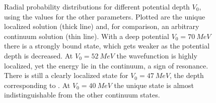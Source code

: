 \documentclass[../main/report.tex]{subfiles}
\begin{document}


\begin{figure}
  \caption{
    Radial probability distributions for different potential depth $V_0$, using the  values for the other parameters. 
    Plotted are the unique localized solution (thick line) and, for comparison, an arbitrary continuum solution (thin line).
    With a deep potential $V_0 = \SI{70}{MeV}$ there is a strongly bound state, which gets weaker as the potential depth is decreased.
    At $V_0 = \SI{52}{MeV}$ the wavefunction is highly localized, yet the energy lie in the continuum, a sign of resonance.
    There is still a clearly localized state for $V_0 = \SI{47}{MeV}$, the depth corresponding to . At $V_0 = \SI{40}{MeV}$ the unique state is almost indistinguishable from the other continuum states.
  } 
  \label{fig:wavefunctions}
  \end{figure}


\newpage\mbox{}
\end{document}
